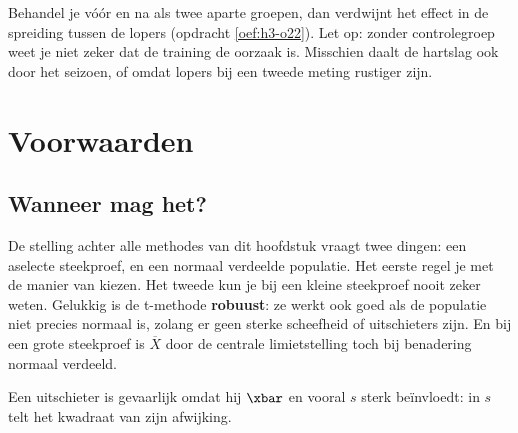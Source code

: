 Behandel je vóór en na als twee aparte groepen, dan verdwijnt het effect in de spreiding tussen de lopers (opdracht \ref{oef:h3-o22}). Let op: zonder controlegroep weet je niet zeker dat de training de oorzaak is. Misschien daalt de hartslag ook door het seizoen, of omdat lopers bij een tweede meting rustiger zijn.

\begin{oefeningen}
\end{oefeningen}

\section{Voorwaarden}

\subsection{Wanneer mag het?}

De stelling achter alle methodes van dit hoofdstuk vraagt twee dingen: een aselecte steekproef, en een normaal verdeelde populatie. Het eerste regel je met de manier van kiezen. Het tweede kun je bij een kleine steekproef nooit zeker weten. Gelukkig is de t-methode \textbf{robuust}: ze werkt ook goed als de populatie niet precies normaal is, zolang er geen sterke scheefheid of uitschieters zijn. En bij een grote steekproef is $\overline{X}$ door de centrale limietstelling toch bij benadering normaal verdeeld.

Een uitschieter is gevaarlijk omdat hij $\xbar$ en vooral $s$ sterk beïnvloedt: in $s$ telt het kwadraat van zijn afwijking.

